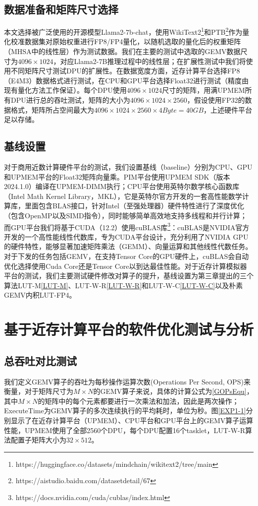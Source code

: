 \subsection{数据准备和矩阵尺寸选择}
本文选择被广泛使用的开源模型Llama2-7b-chat，使用WikiText2\footnote{https://huggingface.co/datasets/mindchain/wikitext2/tree/main}和PTB\footnote{https://aistudio.baidu.com/datasetdetail/67}作为量化校准数据集对原始权重进行FP8/FP4量化，以随机选取的量化后的权重矩阵（MHSA中的线性层）作为测试数据。我们在主要的测试中选取的GEMV数据尺寸为$4096\times 1024$，对应Llama2-7B推理过程中的线性层；在扩展性测试中我们将使用不同矩阵尺寸测试DPU的扩展性。在数据宽度方面，近存计算平台选择FP8（E4M3）数据格式进行测试，在CPU和GPU平台选择Float32进行测试（精度由现有量化方法工作保证）。每个DPU使用$4096\times 1024$尺寸的矩阵，用满UPMEM所有DPU进行总的吞吐测试，矩阵的大小为$4096\times 1024\times 2560$，假设使用FP32的数据格式，矩阵所占空间最大为$4096\times 1024\times 2560\times 4Byte=40GB$，上述硬件平台足以存储。

\subsection{基线设置}
对于商用近数计算硬件平台的测试，我们设置基线（baseline）分别为CPU、GPU和UPMEM平台的Float32矩阵向量乘。PIM平台使用UPMEM SDK（版本 2024.1.0）编译在UPMEM-DIMM执行；CPU平台使用英特尔数学核心函数库（Intel Math Kernel Library，MKL）\cite{IntelMKL}，它是英特尔官方开发的一套高性能数学计算库，里面包含BLAS接口，针对Intel（至强处理器）硬件特性进行了深度优化（包含OpenMP以及SIMD指令），同时能够简单高效地支持多线程和并行计算；而GPU平台我们将基于CUDA（12.2）使用cuBLAS库\footnote{https://docs.nvidia.com/cuda/cublas/index.html}：cuBLAS是NVIDIA官方开发的一个高性能线性代数库，专为CUDA平台设计，充分利用了NVIDIA GPU的硬件特性，能够显著加速矩阵乘法（GEMM）、向量运算和其他线性代数任务。对于下发的任务包括GEMV，在支持Tensor Core的GPU硬件上，cuBLAS会自动优化选择使用Cuda Core还是Tensor Core以到达最佳性能。对于近存计算模拟器平台的测试，我们主要测试硬件修改对算子的提升，基线设置为第三章提出的三个算法LUT-M\ref{LUT-M}、LUT-W-R\ref{LUT-W-R}和LUT-W-C\ref{LUT-W-C}以及朴素GEMV内积LUT-FP4。

\section{基于近存计算平台的软件优化测试与分析}

\subsection{总吞吐对比测试}
我们定义GEMV算子的吞吐为每秒操作运算次数(Operations Per Second, OPS)来衡量，对于矩阵尺寸为$M\times N$的GEMV算子来说，具体的计算公式为\ref{GOPsEqu}，其中$M\times N$的矩阵中的每个元素都要进行一次乘法和加法，因此是两次操作；ExecuteTime为GEMV算子的多次连续执行的平均耗时，单位为秒。图\ref{EXP1-1}分别显示了在近存计算平台（UPMEM）、CPU平台和GPU平台上的GEMV算子运算性能，UPMEM使用了全部2560个DPU，每个DPU配置16个tasklet，LUT-W-R算法配置子矩阵大小为$32\times 512$。

